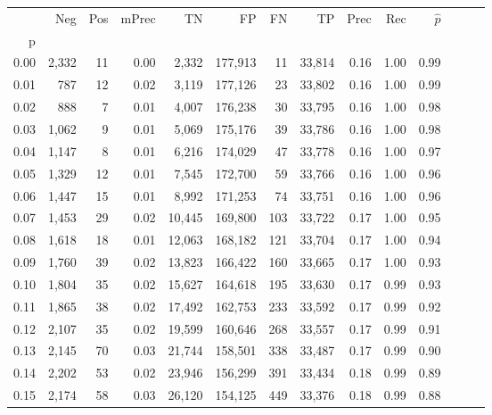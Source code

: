 \begin{tabular}{rrrrrrrrrrrrrr}
\toprule
{} &    Neg &  Pos & mPrec &       TN &       FP &      FN &      TP &  Prec &   Rec & $\hat{p}$ \\
p    &        &      &       &          &          &         &         &       &       &           \\
\midrule
0.00 &  2,332 &   11 &  0.00 &    2,332 &  177,913 &      11 &  33,814 &  0.16 &  1.00 &      0.99 \\
0.01 &    787 &   12 &  0.02 &    3,119 &  177,126 &      23 &  33,802 &  0.16 &  1.00 &      0.99 \\
0.02 &    888 &    7 &  0.01 &    4,007 &  176,238 &      30 &  33,795 &  0.16 &  1.00 &      0.98 \\
0.03 &  1,062 &    9 &  0.01 &    5,069 &  175,176 &      39 &  33,786 &  0.16 &  1.00 &      0.98 \\
0.04 &  1,147 &    8 &  0.01 &    6,216 &  174,029 &      47 &  33,778 &  0.16 &  1.00 &      0.97 \\
0.05 &  1,329 &   12 &  0.01 &    7,545 &  172,700 &      59 &  33,766 &  0.16 &  1.00 &      0.96 \\
0.06 &  1,447 &   15 &  0.01 &    8,992 &  171,253 &      74 &  33,751 &  0.16 &  1.00 &      0.96 \\
0.07 &  1,453 &   29 &  0.02 &   10,445 &  169,800 &     103 &  33,722 &  0.17 &  1.00 &      0.95 \\
0.08 &  1,618 &   18 &  0.01 &   12,063 &  168,182 &     121 &  33,704 &  0.17 &  1.00 &      0.94 \\
0.09 &  1,760 &   39 &  0.02 &   13,823 &  166,422 &     160 &  33,665 &  0.17 &  1.00 &      0.93 \\
0.10 &  1,804 &   35 &  0.02 &   15,627 &  164,618 &     195 &  33,630 &  0.17 &  0.99 &      0.93 \\
0.11 &  1,865 &   38 &  0.02 &   17,492 &  162,753 &     233 &  33,592 &  0.17 &  0.99 &      0.92 \\
0.12 &  2,107 &   35 &  0.02 &   19,599 &  160,646 &     268 &  33,557 &  0.17 &  0.99 &      0.91 \\
0.13 &  2,145 &   70 &  0.03 &   21,744 &  158,501 &     338 &  33,487 &  0.17 &  0.99 &      0.90 \\
0.14 &  2,202 &   53 &  0.02 &   23,946 &  156,299 &     391 &  33,434 &  0.18 &  0.99 &      0.89 \\
0.15 &  2,174 &   58 &  0.03 &   26,120 &  154,125 &     449 &  33,376 &  0.18 &  0.99 &      0.88 \\

\end{tabular}
